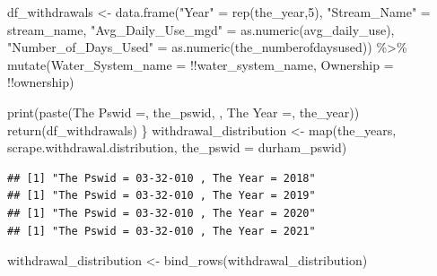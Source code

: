 \documentclass[
  12pt,
]{article}
\newenvironment{Shaded}{\begin{snugshade}}{\end{snugshade}}
\newcommand{\AttributeTok}[1]{\textcolor[rgb]{0.77,0.63,0.00}{#1}}
\newcommand{\DecValTok}[1]{\textcolor[rgb]{0.00,0.00,0.81}{#1}}
\newcommand{\FunctionTok}[1]{\textcolor[rgb]{0.00,0.00,0.00}{#1}}
\newcommand{\NormalTok}[1]{#1}
\newcommand{\OtherTok}[1]{\textcolor[rgb]{0.56,0.35,0.01}{#1}}
\newcommand{\SpecialCharTok}[1]{\textcolor[rgb]{0.00,0.00,0.00}{#1}}
\newcommand{\StringTok}[1]{\textcolor[rgb]{0.31,0.60,0.02}{#1}}
\begin{document}
\begin{Shaded}
\begin{Highlighting}[]
\NormalTok{  df\_withdrawals }\OtherTok{\textless{}{-}} \FunctionTok{data.frame}\NormalTok{(}\StringTok{"Year"} \OtherTok{=} \FunctionTok{rep}\NormalTok{(the\_year,}\DecValTok{5}\NormalTok{),}
                               \StringTok{"Stream\_Name"} \OtherTok{=}\NormalTok{ stream\_name,}
                               \StringTok{"Avg\_Daily\_Use\_mgd"} \OtherTok{=} \FunctionTok{as.numeric}\NormalTok{(avg\_daily\_use),}
                               \StringTok{"Number\_of\_Days\_Used"} \OtherTok{=} \FunctionTok{as.numeric}\NormalTok{(the\_numberofdaysused)) }\SpecialCharTok{\%\textgreater{}\%} 
    \FunctionTok{mutate}\NormalTok{(}\AttributeTok{Water\_System\_name =} \SpecialCharTok{!!}\NormalTok{water\_system\_name,}
         \AttributeTok{Ownership =} \SpecialCharTok{!!}\NormalTok{ownership)}
  
  \FunctionTok{print}\NormalTok{(}\FunctionTok{paste}\NormalTok{(}\StringTok{\textquotesingle{}The Pswid =\textquotesingle{}}\NormalTok{, the\_pswid, }\StringTok{\textquotesingle{}, The Year =\textquotesingle{}}\NormalTok{, the\_year))}
  \FunctionTok{return}\NormalTok{(df\_withdrawals)}
\NormalTok{\}}
\NormalTok{withdrawal\_distribution }\OtherTok{\textless{}{-}} \FunctionTok{map}\NormalTok{(the\_years, scrape.withdrawal.distribution, }\AttributeTok{the\_pswid =}\NormalTok{ durham\_pswid)}
\end{Highlighting}
\end{Shaded}

\begin{verbatim}
## [1] "The Pswid = 03-32-010 , The Year = 2018"
## [1] "The Pswid = 03-32-010 , The Year = 2019"
## [1] "The Pswid = 03-32-010 , The Year = 2020"
## [1] "The Pswid = 03-32-010 , The Year = 2021"
\end{verbatim}

\begin{Shaded}
\begin{Highlighting}[]
\NormalTok{withdrawal\_distribution }\OtherTok{\textless{}{-}} \FunctionTok{bind\_rows}\NormalTok{(withdrawal\_distribution)}
\end{Highlighting}
\end{Shaded}
\end{document}
